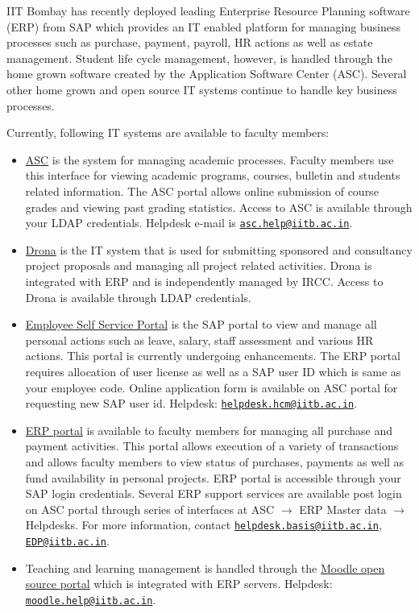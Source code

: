 \documentclass[
  10pt,
  a5paper,
  10pt,
  openany]{amsbook}
\providecommand{\tightlist}{%
  \setlength{\itemsep}{0pt}\setlength{\parskip}{0pt}}
\begin{document}
IIT Bombay has recently deployed leading Enterprise Resource Planning
software (ERP) from SAP which provides an IT enabled platform for
managing business processes such as purchase, payment, payroll, HR
actions as well as estate management. Student life cycle management,
however, is handled through the home grown software created by the
Application Software Center (ASC). Several other home grown and open
source IT systems continue to handle key business processes.

Currently, following IT systems are available to faculty members:

\begin{itemize}
\tightlist
\item
  \href{https://asc.iitb.ac.in}{ASC} is the system for managing academic
  processes. Faculty members use this interface for viewing academic
  programs, courses, bulletin and students related information. The ASC
  portal allows online submission of course grades and viewing past
  grading statistics. Access to ASC is available through your LDAP
  credentials. Helpdesk e-mail is
  \href{mailto:asc.help@iitb.ac.in}{\nolinkurl{asc.help@iitb.ac.in}}.
\item
  \href{https://drona.ircc.iitb.ac.in}{Drona} is the IT system that is
  used for submitting sponsored and consultancy project proposals and
  managing all project related activities. Drona is integrated with ERP
  and is independently managed by IRCC. Access to Drona is available
  through LDAP credentials.
\item
  \href{https://ep.iitb.ac.in}{Employee Self Service Portal} is the SAP
  portal to view and manage all personal actions such as leave, salary,
  staff assessment and various HR actions. This portal is currently
  undergoing enhancements. The ERP portal requires allocation of user
  license as well as a SAP user ID which is same as your employee code.
  Online application form is available on ASC portal for requesting new
  SAP user id. Helpdesk:
  \href{mailto:helpdesk.hcm@iitb.ac.in}{\nolinkurl{helpdesk.hcm@iitb.ac.in}}.
\item
  \href{https://erp.iitb.ac.in}{ERP portal} is available to faculty
  members for managing all purchase and payment activities. This portal
  allows execution of a variety of transactions and allows faculty
  members to view status of purchases, payments as well as fund
  availability in personal projects. ERP portal is accessible through
  your SAP login credentials. Several ERP support services are available
  post login on ASC portal through series of interfaces at ASC
  \(\rightarrow\) ERP Master data \(\rightarrow\) Helpdesks. For more
  information, contact
  \href{mailto:helpdesk.basis@iitb.ac.in}{\nolinkurl{helpdesk.basis@iitb.ac.in}},
  \href{mailto:EDP@iitb.ac.in}{\nolinkurl{EDP@iitb.ac.in}}.
\item
  Teaching and learning management is handled through the
  \href{https://moodle.iitb.ac.in}{Moodle open source portal} which is
  integrated with ERP servers. Helpdesk:
  \href{mailto:moodle.help@iitb.ac.in}{\nolinkurl{moodle.help@iitb.ac.in}}.
\end{itemize}
\end{document}
